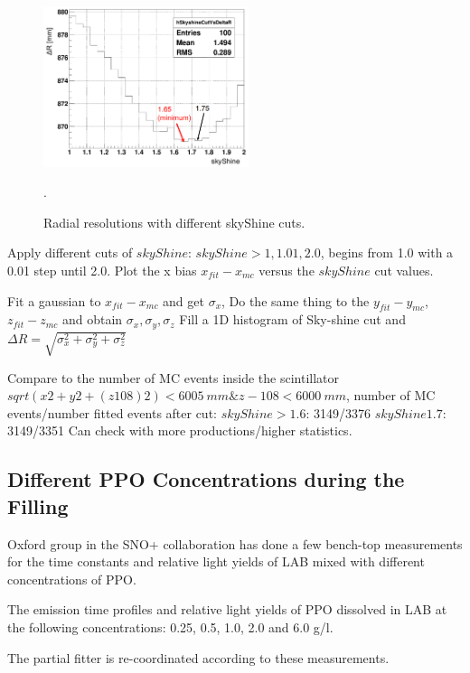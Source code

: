 \begin{figure}
	\centering
	\includegraphics[width=60mm]{skyShineCuts.png}
	\caption{ Radial resolutions with different skyShine cuts.}
	\label{skySHineCutVsFitResol}.
\end{figure}

Apply different cuts of $skyShine$: $skyShine>1, 1.01, 2.0$, begins from 1.0 with a 0.01 step until 2.0.
Plot the x bias $x_{fit}-x_{mc}$ versus the $skyShine$ cut values.

Fit	a gaussian to $x_{fit} - x_{mc}$ and get $\sigma_x$,
Do the same thing to the $y_{fit} - y_{mc}$, $z_{fit} - z_{mc}$ and	obtain	$\sigma_x, \sigma_y, \sigma_z$
Fill a 1D histogram of Sky-shine cut and
$\Delta R= \sqrt{\sigma^2_x+\sigma^2_y+\sigma^2_z}$

Compare to the number of MC events inside the scintillator $sqrt(x2+y2+(z108)2)<6005~mm \& z-108<6000~mm$, number of MC events/number fitted events
after cut:
$skyShine>1.6$: 3149/3376
$skyShine1.7$: 3149/3351
Can check with more productions/higher statistics.

\subsection{Different PPO Concentrations during the Filling}

Oxford group in the SNO+ collaboration has done a few bench-top measurements for the time constants and relative light yields of LAB mixed with different concentrations of PPO\cite{oxfordMeasurement}.

The emission time profiles and relative light yields of PPO dissolved in LAB at the following concentrations: 0.25, 0.5, 1.0, 2.0 and 6.0 g/l.

The partial fitter is re-coordinated according to these measurements.

